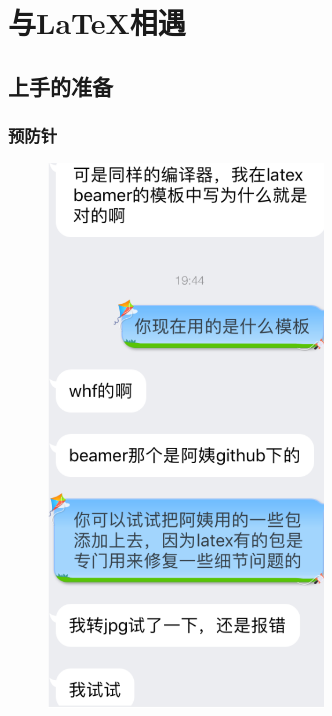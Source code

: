 \section{与\LaTeX 相遇}%

\subsection{上手的准备}
\begin{frame}
    \frametitle{预防针}
    \begin{figure}
    \centering
    \begin{minipage}[t]{0.48\textwidth}
    \centering
    \includegraphics[width=0.65\textwidth]{img//xieyi1.png}
    \end{minipage}
    \begin{minipage}[t]{0.48\textwidth}
    \centering

\end{minipage}
\end{figure}
\end{frame}
